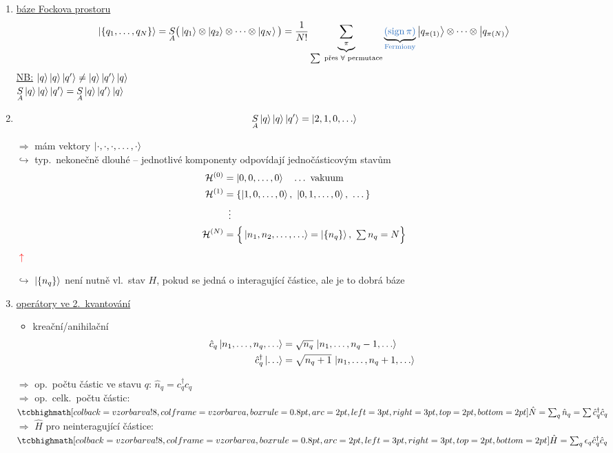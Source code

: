 \begin{enumerate}[label=\arabic*),start=3]
  \item \underline{báze Fockova prostoru}
  \[
    \ket{\{q_1,\dots,q_N\}} = \underset{A}{S}\big(\ket{q_1}\otimes\ket{q_2}\otimes\dots\otimes\ket{q_N}\big)
    = \frac{1}{N!}\underbrace{\sum_\pi}_{\sum\text{ přes }\forall\text{ permutace}}
      \underbrace{\textcolor{NavyBlue}{(\operatorname{sign}\pi)}}_{\textcolor{NavyBlue}{\text{Fermiony}}}
      \ket{q_{\pi(1)}}\otimes\dots\otimes\ket{q_{\pi(N)}}
  \]
  \textcolor{NavyBlue}{\underline{NB:} \quad $\ket{q}\ket{q}\ket{q'} \neq \ket{q}\ket{q'}\ket{q}$ \\
  \hspace*{1.3cm} $\underset{A}{S}\ket{q}\ket{q}\ket{q'} = \underset{A}{S}\ket{q}\ket{q'}\ket{q}$}

  \item \underline{}
  \[
    \underset{A}{S}\ket{q}\ket{q}\ket{q'} = \ket{2,1,0,\dots}
  \]
  \hspace*{4.5cm}{\small $\uparrow$ 2 částice v zákl.\ 1-částic.\ stavu, \ 1 částice v 1.\ excit.\ stavu\dots}

  $\Rightarrow$ mám vektory $\ket{\cdot,\cdot,\cdot,\dots,\cdot}$ \\
  \quad $\hookrightarrow$ typ.\ nekonečně dlouhé -- jednotlivé komponenty odpovídají jednočásticovým stavům
  \begin{align*}
    \mathcal{H}^{(0)} &= \ket{0,0,\dots,0} \quad\dots\ \text{vakuum} \\
    \mathcal{H}^{(1)} &= \{\ket{1,0,\dots,0},\ \ket{0,1,\dots,0},\ \dots\} \\
    &\ \,\vdots \\
    \mathcal{H}^{(N)} &= \Big\{\ket{n_1,n_2,\dots,\dots} = \ket{\{n_q\}},\ \textstyle\sum n_q = N\Big\}
  \end{align*}
  \hspace*{6.5cm}\textcolor{Red}{$\uparrow$ }

  \textcolor{NavyBlue}{$\hookrightarrow$ $\ket{\{n_q\}}$ není nutně vl.\ stav $H$, pokud se jedná o interagující částice, ale je to dobrá báze}

  \item \underline{operátory ve 2.\ kvantování}
  \begin{itemize}
    \item kreační/anihilační
    \begin{align*}
      \hat c_q\ket{n_1,\dots,n_q,\dots} &= \sqrt{n_q}\,\ket{n_1,\dots,n_q - 1,\dots} \\
      \hat c_q^\dagger\ket{\dots} &= \sqrt{n_q + 1}\,\ket{n_1,\dots,n_q + 1,\dots}
    \end{align*}
  \end{itemize}
  $\Rightarrow$ op.\ počtu částic ve stavu $q$: \quad $\hat n_q = c_q^\dagger c_q$ \\
  $\Rightarrow$ op.\ celk.\ počtu částic: \quad $\vzorec{\hat N = \sum_q\hat n_q = \sum\hat c_q^\dagger\hat c_q}$ \\
  $\Rightarrow$ $\hat H$ pro neinteragující částice: \quad $\vzorec{\hat H = \sum_q\epsilon_q\hat c_q^\dagger\hat c_q}$


\end{enumerate}
